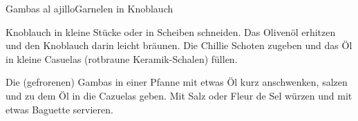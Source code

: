 \begin{recipe}{Gambas al ajillo}{Garnelen in Knoblauch}
  \label{Gambas al ajillo}
  \inglist
  
  \steps
  Knoblauch in kleine Stücke oder in Scheiben schneiden. Das Olivenöl erhitzen und den 
  Knoblauch darin leicht bräunen. Die Chillie Schoten zugeben und das Öl in kleine
  Casuelas (rotbraune Keramik-Schalen) füllen.
  
  Die (gefrorenen) Gambas in einer Pfanne mit etwas Öl kurz anschwenken, salzen und zu dem
  Öl in die Cazuelas geben. Mit Salz oder Fleur de Sel würzen und mit etwas Baguette
  servieren.
\end{recipe}
